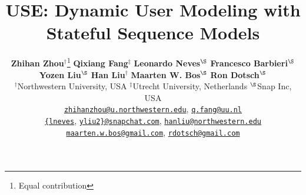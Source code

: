 \documentclass{article}
\begin{document}
\title{USE: Dynamic User Modeling  with \\ Stateful Sequence Models}


\author{
\textbf{Zhihan Zhou}$^{\dagger}$\thanks{Equal contribution}
\qquad
\textbf{Qixiang Fang}$^{\ddag}$\footnotemark[1]
\qquad
\textbf{Leonardo Neves}$^{\S}$
\qquad
\textbf{Francesco Barbieri}$^{\S}$ 
\\
\textbf{Yozen Liu}$^{\S}$ 
\qquad
\textbf{Han Liu}$^{\dagger}$
\qquad
\textbf{Maarten W. Bos}$^{\S}$ 
\qquad
\textbf{Ron Dotsch}$^{\S}$ 
\\
$^\dagger$Northwestern University, USA  \:
$^\ddag$Utrecht University, Netherlands \: 
$^\S$Snap Inc, USA \\ 
{\footnotesize 
   \href{mailto:zhihanzhou@u.northwestern.edu}{\texttt{zhihanzhou@u.northwestern.edu}},   
   \href{mailto:q.fang@uu.nl}{\texttt{q.fang@uu.nl}}
   }
   \\
{\footnotesize 
    \href{mailto:lneves@snapchat.com}{\texttt{\{lneves}}, \href{mailto:yliu2@snapchat.com}{\texttt{yliu2\}@snapchat.com}},   
   \href{mailto:hanliu@northwestern.edu}{\texttt{hanliu@northwestern.edu}}}  \\
{\footnotesize
   \href{mailto:maarten.w.bos@gmail.com}{\texttt{maarten.w.bos@gmail.com}},
   \href{mailto:rdotsch@gmail.com}{\texttt{rdotsch@gmail.com}}} 
}





\maketitle
\end{document}
